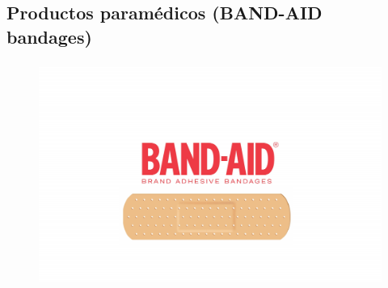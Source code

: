 \documentclass[compress, aspectratio=169]{beamer} %
\begin{document}
	\subsection{Productos paramédicos (BAND-AID bandages)}
		\begin{frame}
	\transdissolve[duration=1]

			\frametitle{\insertsubsection}
			
			\begin{figure}
				\includegraphics[width=12cm]{band.jpeg}
			\end{figure}
			
			
			
			
		\end{frame}
\end{document}

